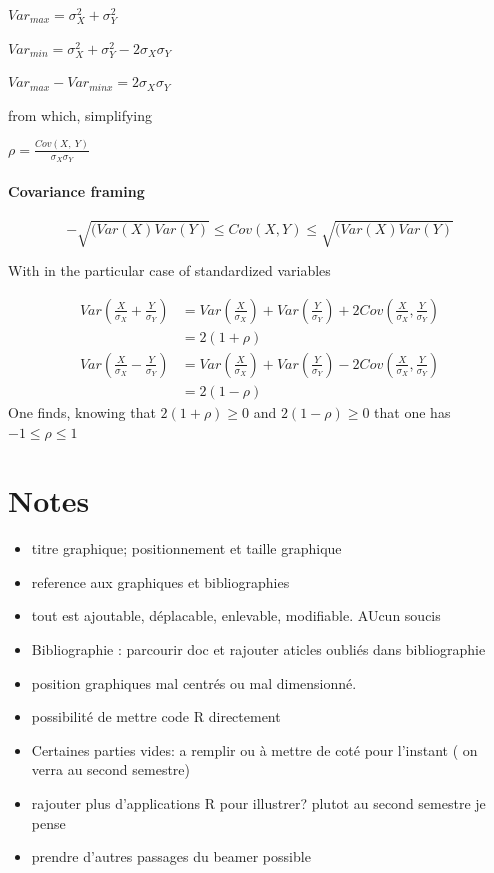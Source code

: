 \documentclass[
]{report}
\providecommand{\tightlist}{%
  \setlength{\itemsep}{0pt}\setlength{\parskip}{0pt}}
\begin{document}
\(Var_{max} = \sigma_X^2+\sigma_Y^2\)

\(Var_{min} = \sigma_X^2+\sigma_Y^2-2\sigma_X\sigma_Y\)

\(Var_{max}-Var_{minx} = 2\sigma_X\sigma_Y\)

from which, simplifying

\(\rho = \frac{Cov(X,~Y)}{\sigma_X\sigma_Y}\)

\hypertarget{covariance-framing}{%
\subsubsection{Covariance framing}\label{covariance-framing}}

\[-\sqrt{(Var(X)Var(Y)} \leq Cov(X,Y) \leq \sqrt{(Var(X)Var(Y)}\]

With in the particular case of standardized variables

\begin{align*}
Var(\frac{X}{\sigma_X}+\frac{Y}{\sigma_Y})&= Var(\frac{X}{\sigma_X})+Var(\frac{Y}{\sigma_Y})+2Cov(\frac{X}{\sigma_X},\frac{Y}{\sigma_Y})\\
&=2(1+\rho)\\
Var(\frac{X}{\sigma_X}-\frac{Y}{\sigma_Y})&= Var(\frac{X}{\sigma_X})+Var(\frac{Y}{\sigma_Y})-2Cov(\frac{X}{\sigma_X},\frac{Y}{\sigma_Y})\\
&=2(1-\rho)
\end{align*}
One finds, knowing that \(2(1+\rho) \geq 0\) and \(2(1-\rho)\geq 0\) that one has \(-1 \le \rho \le 1\)

\hypertarget{notes}{%
\chapter{Notes}\label{notes}}

\begin{itemize}
\tightlist
\item
  titre graphique; positionnement et taille graphique
\item
  reference aux graphiques et bibliographies
\item
  tout est ajoutable, déplacable, enlevable, modifiable. AUcun soucis
\item
  Bibliographie : parcourir doc et rajouter aticles oubliés dans bibliographie
\item
  position graphiques mal centrés ou mal dimensionné.
\item
  possibilité de mettre code R directement
\item
  Certaines parties vides: a remplir ou à mettre de coté pour l'instant ( on verra au second semestre)
\item
  rajouter plus d'applications R pour illustrer? plutot au second semestre je pense
\item
  prendre d'autres passages du beamer possible
\end{itemize}

  
\end{document}
